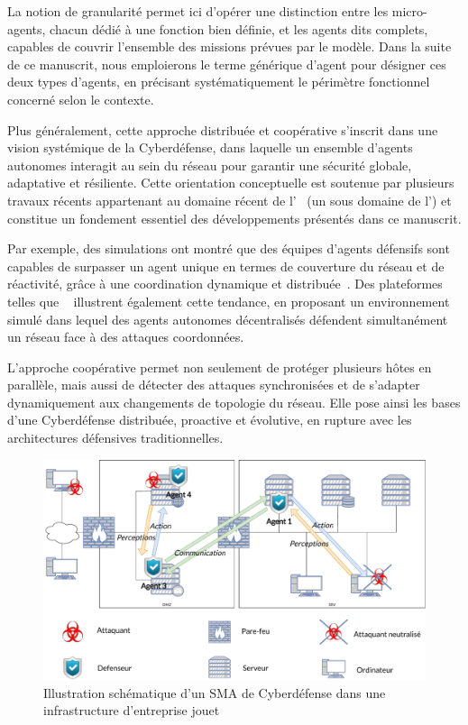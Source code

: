 La notion de granularité permet ici d'opérer une distinction entre les micro-agents, chacun dédié à une fonction bien définie, et les agents  dits complets, capables de couvrir l'ensemble des missions prévues par le modèle. Dans la suite de ce manuscrit, nous emploierons le terme générique d'agent  pour désigner ces deux types d'agents, en précisant systématiquement le périmètre fonctionnel concerné selon le contexte.

Plus généralement, cette approche distribuée et coopérative s'inscrit dans une vision systémique de la Cyberdéfense, dans laquelle un ensemble d'agents autonomes interagit au sein du réseau pour garantir une sécurité globale, adaptative et résiliente. Cette orientation conceptuelle est soutenue par plusieurs travaux récents appartenant au domaine récent de l'~\cite{Vyas2023} (un sous domaine de l') et constitue un fondement essentiel des développements présentés dans ce manuscrit.

Par exemple, des simulations ont montré que des équipes d'agents défensifs sont capables de surpasser un agent unique en termes de couverture du réseau et de réactivité, grâce à une coordination dynamique et distribuée~\cite{RLResilientCyberdefense2024}.
Des plateformes telles que ~\cite{cage_challenge_3_announcement} illustrent également cette tendance, en proposant un environnement simulé dans lequel des agents autonomes décentralisés défendent simultanément un réseau face à des attaques coordonnées.

L'approche coopérative permet non seulement de protéger plusieurs hôtes en parallèle, mais aussi de détecter des attaques synchronisées et de s'adapter dynamiquement aux changements de topologie du réseau. Elle pose ainsi les bases d'une Cyberdéfense distribuée, proactive et évolutive, en rupture avec les architectures défensives traditionnelles.

\begin{figure}[h]
  \centering
  \includegraphics[width=\linewidth]{figures/infra_MAS_illustration.pdf}
  \caption{Illustration schématique d'un SMA de Cyberdéfense dans une infrastructure d'entreprise jouet}
  \label{fig:distributed_sma}
\end{figure}

